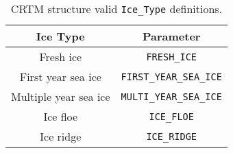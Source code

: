 \begin{table}[htp]
  \centering
  \begin{tabular}{|c|c|}
    \hline
    \sffamily\textbf{Ice Type} & \sffamily\textbf{Parameter} \\
    \hline\hline
            Fresh ice        &   \texttt{FRESH\_ICE} \\       
        First year sea ice   &   \texttt{FIRST\_YEAR\_SEA\_ICE} \\
      Multiple year sea ice  &   \texttt{MULTI\_YEAR\_SEA\_ICE} \\
            Ice floe         &   \texttt{ICE\_FLOE} \\            
            Ice ridge        &   \texttt{ICE\_RIDGE} \\           
    \hline
  \end{tabular}
  \caption{CRTM \Surface{} structure valid \texttt{Ice\_Type} definitions.}
  \label{tab:surface_ice_type}
\end{table}

